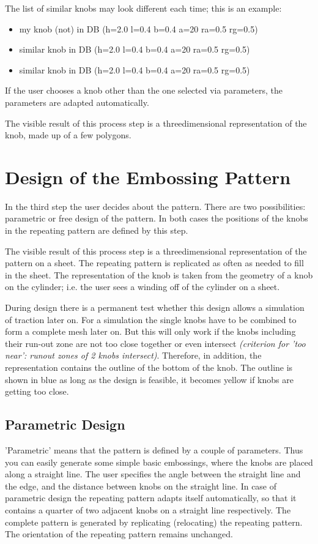 The list of similar knobs may look different each time; this is an example:
\begin{itemize}
\item my knob (not) in DB (h=2.0 l=0.4 b=0.4 a=20 ra=0.5 rg=0.5)
\item similar knob in DB (h=2.0 l=0.4 b=0.4 a=20 ra=0.5 rg=0.5)
\item similar knob in DB (h=2.0 l=0.4 b=0.4 a=20 ra=0.5 rg=0.5)
\end{itemize}

If the user chooses a knob other than the one selected via parameters, the parameters are 
adapted automatically.

The visible result of this process step is a threedimensional representation of the knob, 
made up of a few polygons.


\section{Design of the Embossing Pattern}

In the third step the user decides about the pattern. There are two possibilities: 
parametric or free design of the pattern. In both cases the positions of the 
knobs in the repeating pattern are defined by this step.

The visible result of this process step is a threedimensional representation of the pattern 
on a sheet. The repeating pattern is replicated as often as needed to fill 
in the sheet. The representation of the knob is taken from the geometry of 
a knob on the cylinder; i.e. the user sees a winding off of the cylinder on a sheet.

During design there is a permanent test whether this design allows a simulation 
of  traction later on. For a simulation the single knobs have to be combined 
to form a complete mesh later on.
But this will only work if the knobs including their run-out zone are not 
too close together or even intersect {\it (criterion for 'too near': runout
zones of 2 knobs intersect)}.   
Therefore, in addition, the representation contains  the outline of the bottom 
of the knob. The outline is shown in blue as long as the design is feasible, 
it becomes yellow if  knobs are getting too close.


\subsection{Parametric Design}

'Parametric' means that the pattern is defined by a couple of parameters. 
Thus you can easily generate some simple basic embossings, where the knobs 
are placed along a straight line. The user specifies the angle between the straight 
line and the edge, and the distance between knobs on the straight line. 
In case of parametric design the repeating pattern adapts itself automatically, 
so that it contains a quarter of  two adjacent knobs on a straight line 
respectively. The complete pattern is generated by replicating (relocating) 
the repeating pattern. The orientation of the repeating pattern remains unchanged.

